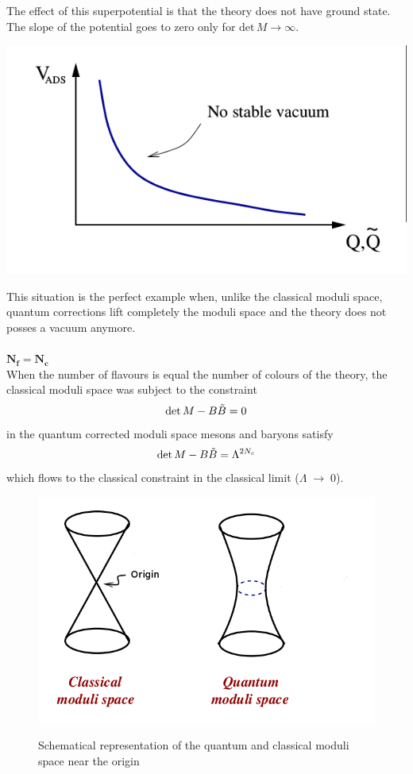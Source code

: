 The effect of this superpotential is that the theory does not have ground state.
The slope of the potential goes to zero only for $\mathrm{det} \, {M}  \rightarrow \infty $.
\begin{center}
\includegraphics[scale=0.5]{ads_super.png}
\end{center}
This situation is the perfect example when, unlike the classical moduli space, quantum corrections lift completely the moduli space and the theory does not posses a vacuum anymore.
\\
\\
$\mathbf{ N_f = N_c}$\\
When the number of flavours is equal the number of colours of the theory, the classical moduli space was subject to the constraint
\begin{equation}
 \mathrm{det } \,{M} - B \tilde{B} = 0
\end{equation}
in the quantum corrected moduli space mesons and baryons satisfy \cite{Seiberg:1994bz}
\begin{equation}
 \mathrm{det } \,{M} - B \tilde{B} = \Lambda^{2 N_c}
\end{equation}
which flows to the classical constraint in the classical limit ($\Lambda \; \rightarrow \;0$).

\begin{figure}
\centering
{\includegraphics[width=5 cm]{quantum_moduli_space_sqcd.png} }
{\caption{Schematical representation of the quantum and classical moduli space near the origin}}
\end{figure}

